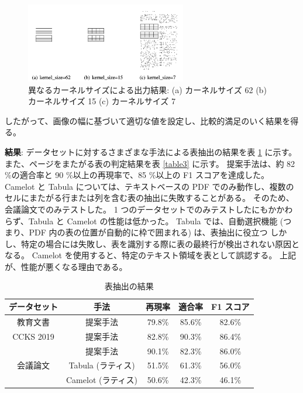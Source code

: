 \documentclass[uplatex, twocolumn,10pt]{jsarticle}
\begin{document}
\begin{figure}[tp]
    \begin{center}
        \includegraphics*[width=7cm]{image/master/master2/Fig4.png}
        \caption{異なるカーネルサイズによる出力結果: (a) カーネルサイズ 62 (b) カーネルサイズ 15 (c) カーネルサイズ 7}
        \label{fig4}
    \end{center}
\end{figure}

したがって、画像の幅に基づいて適切な値を設定し、比較的満足のいく結果を得る。

\textbf{結果}:
データセットに対するさまざまな手法による表抽出の結果を表 \ref{table2} に示す。
また、ページをまたがる表の判定結果を表 \ref{table3} に示す。
提案手法は、約 82 \%の適合率と 90 \%以上の再現率で、85 \%以上の F1 スコアを達成した。
Camelot と Tabula については、テキストベースの PDF でのみ動作し、複数のセルにまたがる行または列を含む表の抽出に失敗することがある。
そのため、会議論文でのみテストした。
1 つのデータセットでのみテストしたにもかかわらず、Tabula と Camelot の性能は低かった。
Tabula では、自動選択機能 (つまり、PDF 内の表の位置が自動的に枠で囲まれる) は、表抽出に役立つ
しかし、特定の場合には失敗し、表を識別する際に表の最終行が検出されない原因となる。
Camelot を使用すると、特定のテキスト領域を表として誤認する。
上記が、性能が悪くなる理由である。

\begin{table}[tp]
    \centering
    \caption{表抽出の結果}
    \label{table2}
    \begin{tabular}{ccccc}
        データセット & 手法 & 再現率 & 適合率 & F1 スコア \\
        \toprule
        教育文書 & 提案手法 & 79.8\% & 85.6\% & 82.6\% \\
        CCKS 2019 & 提案手法 & 82.8\% & 90.3\% & 86.4\% \\
        \multirow{3}{*}{会議論文} & 提案手法 & 90.1\% & 82.3\% & 86.0\% \\
                                & Tabula (ラティス) & 51.5\% & 61.3\% & 56.0\% \\
                                & Camelot (ラティス) & 50.6\% & 42.3\% & 46.1\% \\
        \bottomrule
    \end{tabular}
\end{table}
\end{document}
